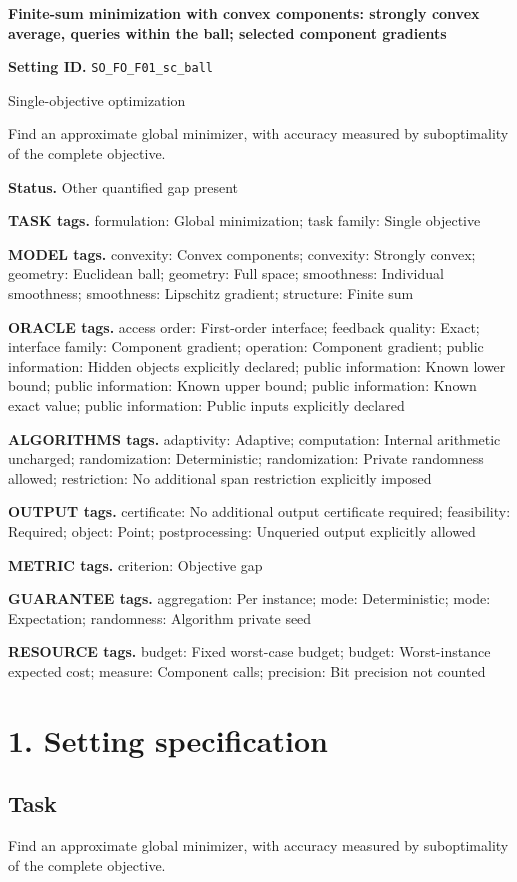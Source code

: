 \documentclass[10pt,a4paper]{article}
\begin{document}
\raggedright

{\LARGE\bfseries\sffamily\color{AtlasNavy} Finite-sum minimization with convex components: strongly convex average, queries within the ball; selected component gradients\par}\vspace{5pt}
\textbf{Setting ID.} \texttt{SO\_\allowbreak{}FO\_\allowbreak{}F01\_\allowbreak{}sc\_\allowbreak{}ball}

Single-objective optimization

Find an approximate global minimizer, with accuracy measured by suboptimality of the complete objective.

\textbf{Status.} Other quantified gap present

\textbf{TASK tags.} formulation: Global minimization; task family: Single objective

\textbf{MODEL tags.} convexity: Convex components; convexity: Strongly convex; geometry: Euclidean ball; geometry: Full space; smoothness: Individual smoothness; smoothness: Lipschitz gradient; structure: Finite sum

\textbf{ORACLE tags.} access order: First-order interface; feedback quality: Exact; interface family: Component gradient; operation: Component gradient; public information: Hidden objects explicitly declared; public information: Known lower bound; public information: Known upper bound; public information: Known exact value; public information: Public inputs explicitly declared

\textbf{ALGORITHMS tags.} adaptivity: Adaptive; computation: Internal arithmetic uncharged; randomization: Deterministic; randomization: Private randomness allowed; restriction: No additional span restriction explicitly imposed

\textbf{OUTPUT tags.} certificate: No additional output certificate required; feasibility: Required; object: Point; postprocessing: Unqueried output explicitly allowed

\textbf{METRIC tags.} criterion: Objective gap

\textbf{GUARANTEE tags.} aggregation: Per instance; mode: Deterministic; mode: Expectation; randomness: Algorithm private seed

\textbf{RESOURCE tags.} budget: Fixed worst-case budget; budget: Worst-instance expected cost; measure: Component calls; precision: Bit precision not counted

\section{1. Setting specification}
\subsection{Task}
Find an approximate global minimizer, with accuracy measured by suboptimality of the complete objective.
\end{document}
